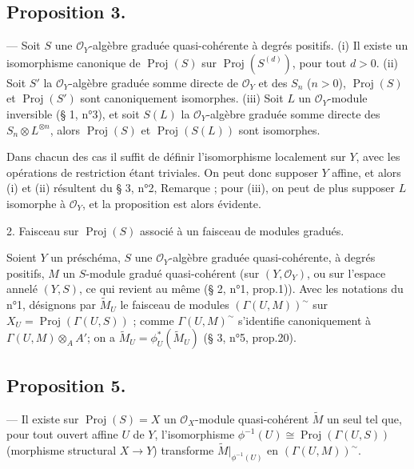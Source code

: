 \newpage


\subsection*{Proposition 3.} — Soit $S$ une $\mathcal{O}_Y$-algèbre graduée quasi-cohérente à degrés positifs.
(i) Il existe un isomorphisme canonique de $\operatorname{Proj}(S)$ sur $\operatorname{Proj}(S^{(d)})$, pour tout $d > 0$.
(ii) Soit $S'$ la $\mathcal{O}_Y$-algèbre graduée somme directe de $\mathcal{O}_Y$ et des $S_n$ ($n > 0$), $\operatorname{Proj}(S)$ et $\operatorname{Proj}(S')$ sont canoniquement isomorphes.
(iii) Soit $L$ un $\mathcal{O}_Y$-module inversible (§ 1, n°3), et soit $S(L)$ la $\mathcal{O}_Y$-algèbre graduée somme directe des $S_n \otimes L^{\otimes n}$, alors $\operatorname{Proj}(S)$ et $\operatorname{Proj}(S(L))$ sont isomorphes.

Dans chacun des cas il suffit de définir l'isomorphisme localement sur $Y$, avec les opérations de restriction étant triviales. On peut donc supposer $Y$ affine, et alors (i) et (ii) résultent du § 3, n°2, Remarque ; pour (iii), on peut de plus supposer $L$ isomorphe à $\mathcal{O}_Y$, et la proposition est alors évidente.

2. Faisceau sur $\operatorname{Proj}(S)$ associé à un faisceau de modules gradués.

Soient $Y$ un préschéma, $S$ une $\mathcal{O}_Y$-algèbre graduée quasi-cohérente, à degrés positifs, $M$ un $S$-module gradué quasi-cohérent (sur $(Y, \mathcal{O}_Y)$, ou sur l'espace annelé $(Y, S)$, ce qui revient au même (§ 2, n°1, prop.1)). Avec les notations du n°1, désignons par $\widetilde{M}_U$ le faisceau de modules $(\Gamma(U, M))^{\sim}$ sur $X_U = \operatorname{Proj}(\Gamma(U, S))$ ; comme $\Gamma(U, M)^{\sim}$ s'identifie canoniquement à $\Gamma(U, M) \otimes_A A'$; on a $\widetilde{M}_U = \phi_U^*(\widetilde{M}_U)$ (§ 3, n°5, prop.20).

\subsection*{Proposition 5.} — Il existe sur $\operatorname{Proj}(S) = X$ un $\mathcal{O}_X$-module quasi-cohérent $\widetilde{M}$ un seul tel que, pour tout ouvert affine $U$ de $Y$, l'isomorphisme $\phi^{-1}(U) \cong \operatorname{Proj}(\Gamma(U, S))$ (morphisme structural $X \to Y$) transforme $\widetilde{M}|_{\phi^{-1}(U)}$ en $(\Gamma(U, M))^{\sim}$.

